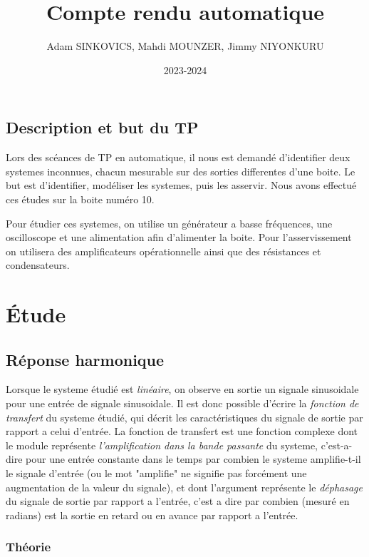 \documentclass[12pt, a4paper]{report}
\title{Compte rendu automatique}
\author{Adam SINKOVICS, Mahdi MOUNZER, Jimmy NIYONKURU}
\date{2023-2024}
\begin{document}
\maketitle
\pagebreak

\section*{Description et but du TP}

Lors des scéances de TP en automatique, il nous est demandé d'identifier
deux systemes inconnues, chacun mesurable sur des sorties differentes
d'une boite.
Le but est d'identifier, modéliser les systemes, puis les asservir. Nous avons
effectué ces études sur la boite numéro 10.\par
Pour étudier ces systemes, on utilise un générateur a basse fréquences,
une oscilloscope et une alimentation afin d'alimenter la boite. Pour l'asservissement on utilisera des amplificateurs opérationnelle ainsi que
des résistances et condensateurs.
\nopagebreak

\chapter{Étude}

\section{Réponse harmonique}

Lorsque le systeme étudié est \textit{linéaire}, on observe en sortie un signale sinusoidale 
pour une entrée de signale sinusoidale. Il est donc possible d'écrire la \textit{fonction de transfert}
du systeme étudié, qui décrit les caractéristiques du signale de sortie par rapport
a celui d'entrée. La fonction de transfert est une fonction complexe dont le module
représente \textit{l'amplification dans la bande passante} du systeme, c'est-a-dire pour une entrée constante dans le temps
par combien le systeme amplifie-t-il le signale d'entrée (ou le mot "amplifie" ne signifie pas
forcément une augmentation de la valeur du signale), et dont l'argument représente le \textit{déphasage} du signale
de sortie par rapport a l'entrée, c'est a dire par combien (mesuré en radians) est la sortie en retard
ou en avance par rapport a l'entrée.

\subsection{Théorie}
\end{document}
